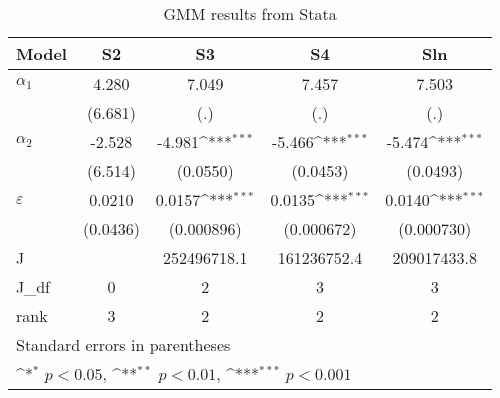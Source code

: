 \begin{table}[h!]\centering
\newcommand{\sym}[1]{\ifmmode^{#1}\else\(^{#1}\)\fi}
\caption{GMM results from Stata}
\begin{tabular}{l*{4}{c}}
\hline\hline
Model           &\multicolumn{1}{c}{S2}&\multicolumn{1}{c}{S3}&\multicolumn{1}{c}{S4}&\multicolumn{1}{c}{Sln}\\
\hline
$\alpha_1$           &       4.280         &       7.049         &       7.457         &       7.503         \\
                    &     (6.681)         &         (.)         &         (.)         &         (.)         \\
\hline
$\alpha_2$           &      -2.528         &      -4.981\sym{***}&      -5.466\sym{***}&      -5.474\sym{***}\\
                    &     (6.514)         &    (0.0550)         &    (0.0453)         &    (0.0493)         \\
\hline
$\varepsilon$       &      0.0210         &      0.0157\sym{***}&      0.0135\sym{***}&      0.0140\sym{***}\\
                    &    (0.0436)         &  (0.000896)         &  (0.000672)         &  (0.000730)         \\
\hline
J                   &                     & 252496718.1         & 161236752.4         & 209017433.8         \\
J\_df                &           0         &           2         &           3         &           3         \\
rank                &           3         &           2         &           2         &           2         \\
\hline\hline
\multicolumn{5}{l}{\footnotesize Standard errors in parentheses}\\
\multicolumn{5}{l}{\footnotesize \sym{*} \(p<0.05\), \sym{**} \(p<0.01\), \sym{***} \(p<0.001\)}\\
\end{tabular}\label{tab:gmm_stata_table}
\end{table}
